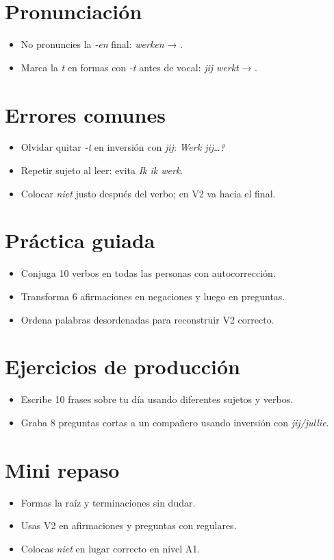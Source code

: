 \section{Pronunciación}
\begin{itemize}[leftmargin=*]
	\item No pronuncies la \textit{-en} final: \textit{werken} → .
	\item Marca la \textit{t} en formas con \textit{-t} antes de vocal: \textit{jij werkt} → .
\end{itemize}

\section{Errores comunes}
\begin{itemize}[leftmargin=*]
	\item Olvidar quitar \textit{-t} en inversión con \textit{jij}: \textit{Werk jij\ldots?}
	\item Repetir sujeto al leer: evita \textit{Ik ik werk}.
	\item Colocar \textit{niet} justo después del verbo; en V2 va hacia el final.
\end{itemize}

\section{Práctica guiada}
\begin{itemize}[leftmargin=*]
	\item Conjuga 10 verbos en todas las personas con autocorrección.
	\item Transforma 6 afirmaciones en negaciones y luego en preguntas.
	\item Ordena palabras desordenadas para reconstruir V2 correcto.
\end{itemize}

\section{Ejercicios de producción}
\begin{itemize}[leftmargin=*]
	\item Escribe 10 frases sobre tu día usando diferentes sujetos y verbos.
	\item Graba 8 preguntas cortas a un compañero usando inversión con \textit{jij/jullie}.
\end{itemize}

\section{Mini repaso}
\begin{itemize}[leftmargin=*]
	\item Formas la raíz y terminaciones sin dudar.
	\item Usas V2 en afirmaciones y preguntas con regulares.
	\item Colocas \textit{niet} en lugar correcto en nivel A1.
\end{itemize}

